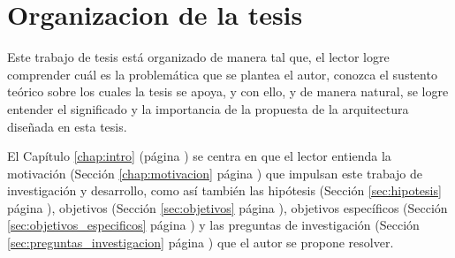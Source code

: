 \chapter*{Organizacion de la tesis}
\label{chap:organizacion}

Este trabajo de tesis está organizado de manera tal que, el lector logre comprender
cuál es la problemática que se plantea el autor, conozca el sustento
teórico sobre los cuales la tesis se apoya, y con ello,  y de manera natural, se logre
entender el significado y la importancia de la propuesta de la arquitectura diseñada
en esta tesis.

El Capítulo \ref{chap:intro} (página \pageref{chap:intro}) se centra en que el lector
entienda la motivación (Sección \ref{chap:motivacion} página \pageref{chap:motivacion})
que impulsan este trabajo de investigación y desarrollo, como así también las
hipótesis (Sección \ref{sec:hipotesis} página \pageref{sec:hipotesis}), objetivos
(Sección \ref{sec:objetivos} página \pageref{sec:objetivos}), objetivos específicos
(Sección \ref{sec:objetivos_especificos} página \pageref{sec:objetivos_especificos}) y las
preguntas de investigación (Sección \ref{sec:preguntas_investigacion} página \pageref{sec:preguntas_investigacion}) que el autor se propone resolver.

